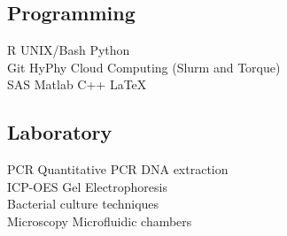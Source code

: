 \documentclass[]{deedy-resume-openfont}
\begin{document}
\begin{minipage}[t]{0.33\textwidth}
\subsection{Programming}
R \textbullet{}   UNIX/Bash \textbullet{} Python \textbullet{} \\
Git \textbullet{} HyPhy \textbullet{} Cloud Computing (Slurm and Torque) \\
SAS \textbullet{} Matlab \textbullet{} C++ \textbullet{}  \LaTeX\ \\
\sectionsep

\subsection{Laboratory}
PCR \textbullet{} Quantitative PCR \textbullet{} DNA extraction \\
ICP-OES \textbullet{} Gel Electrophoresis \\
Bacterial culture techniques \\
Microscopy \textbullet{} Microfluidic chambers \\


%
%

\end{minipage} 
\hfill
\end{document}
